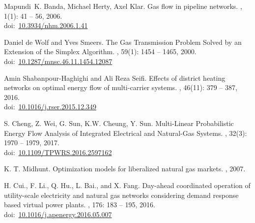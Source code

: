 \documentclass[12pt,a4paper,oneside]{book}
\newcommand{\doi}[1]{doi:~\href{https://doi.org/#1}{#1}}
\begin{document}
\begin{thebibliography}{99}
	Mapundi~K. Banda, Michael Herty, Axel Klar.
	\newblock Gas flow in pipeline networks.
	, 1(1): 41 -- 56, 2006.\\
	\doi{10.3934/nhm.2006.1.41} 
	
	Daniel de Wolf and Yves Smeers.
	\newblock The Gas Transmission Problem Solved by an Extension of the Simplex Algorithm.
	, 59(1): 1454 -- 1465, 2000.\\
	\doi{10.1287/mnsc.46.11.1454.12087}
	
	Amin Shabanpour-Haghighi and Ali Reza Seifi.
	\newblock Effects of district heating networks on optimal energy flow of multi-carrier systems.
	, 46(11): 379 -- 387, 2016.\\
	\doi{10.1016/j.rser.2015.12.349}
		
	S. Cheng, Z. Wei, G. Sun, K.W. Cheung, Y. Sun.
	\newblock Multi-Linear Probabilistic Energy Flow Analysis of Integrated Electrical and Natural-Gas Systems.
	, 32(3): 1970 -- 1979, 2017.\\
	\doi{10.1109/TPWRS.2016.2597162}
	
	K. T. Midhunt.
	\newblock Optimization models for liberalized natural gas markets.
	, 2007.	
	
	H. Cui., F. Li., Q. Hu., L. Bai., and X. Fang.
	\newblock Day-ahead coordinated operation of utility-scale electricity and natural gas networks considering demand response based virtual power plants.
	, 176: 183 -- 195, 2016.\\
	\doi{10.1016/j.apenergy.2016.05.007}
	
    \end{thebibliography}	
\end{document}
